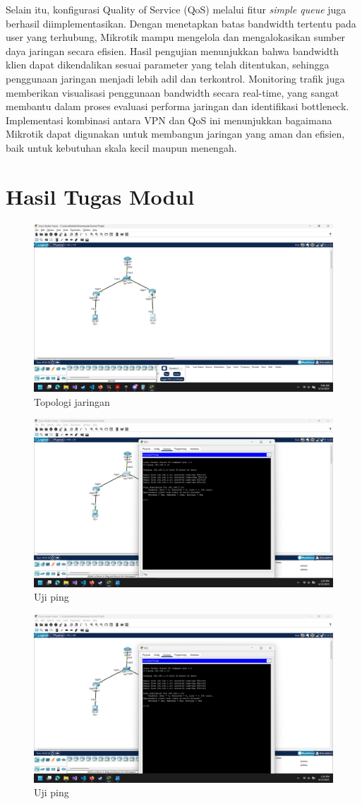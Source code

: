 Selain itu, konfigurasi Quality of Service (QoS) melalui fitur \textit{simple queue} juga berhasil diimplementasikan. Dengan menetapkan batas 
bandwidth tertentu pada user yang terhubung, Mikrotik mampu mengelola dan mengalokasikan sumber daya jaringan secara efisien. Hasil pengujian 
menunjukkan bahwa bandwidth klien dapat dikendalikan sesuai parameter yang telah ditentukan, sehingga penggunaan jaringan menjadi lebih adil dan 
terkontrol. Monitoring trafik juga memberikan visualisasi penggunaan bandwidth secara real-time, yang sangat membantu dalam proses evaluasi 
performa jaringan dan identifikasi bottleneck. Implementasi kombinasi antara VPN dan QoS ini menunjukkan bagaimana Mikrotik dapat digunakan 
untuk membangun jaringan yang aman dan efisien, baik untuk kebutuhan skala kecil maupun menengah.

\section{Hasil Tugas Modul}

    \begin{figure}[H]
        \centering
        \includegraphics[width=0.5\linewidth]{tumod1.png}
        \caption{Topologi jaringan}
        \label{fig:Topologi-jaringan}
    \end{figure}

    \begin{figure}[H]
        \centering
        \includegraphics[width=0.5\linewidth]{tumod2.png}
        \caption{Uji ping}
        \label{fig:Pengujian-koneksi}
    \end{figure}

    \begin{figure}[H]
        \centering
        \includegraphics[width=0.5\linewidth]{tumod3.png}
        \caption{Uji ping}
        \label{fig:Pengujian-koneksi}
    \end{figure}

